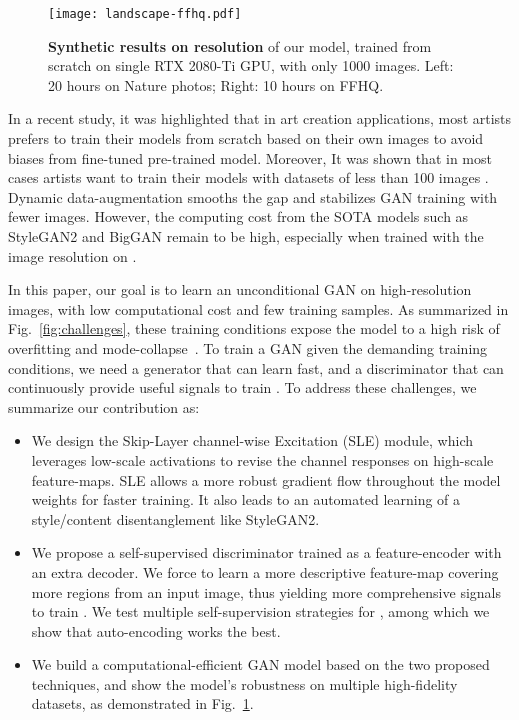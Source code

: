 \documentclass{article} \usepackage{iclr2021_conference,times}
\begin{document}
\begin{figure}[h]
\begin{center}
\texttt{[image: landscape-ffhq.pdf]}
\end{center}
\caption{\textbf{Synthetic results on  resolution} of our model, trained from scratch on single RTX 2080-Ti GPU, with only 1000 images. Left: 20 hours on Nature photos; Right: 10 hours on FFHQ.}
\label{fig:quality-ours}
\end{figure}

In a recent study, it was highlighted that in art creation applications, most artists prefers to train their models from scratch based on their own images to avoid biases from fine-tuned pre-trained model. Moreover, It was shown that in most cases artists want to train their models with datasets of less than 100 images \citep{elgammal2020artists}. Dynamic data-augmentation \citep{karras2020training,zhao2020differentiable} smooths the gap and stabilizes GAN training with fewer images. However, the computing cost from the SOTA models such as StyleGAN2 \citep{karras2020analyzing} and BigGAN \citep{brock2018large} remain to be high, especially when trained with the image resolution on . 

In this paper, our goal is to learn an unconditional GAN on high-resolution images, with low computational cost and few training samples. As summarized in Fig.~\ref{fig:challenges}, these training conditions expose the model to a high risk of  overfitting and mode-collapse~\citep{arjovsky2017towards,zhang2018pa}. To train a GAN given the demanding training conditions, we need a generator  that can learn fast, and a discriminator  that can continuously provide useful signals to train . To address these challenges, we summarize our contribution as:
\begin{itemize}
\item We design the Skip-Layer channel-wise Excitation (SLE) module, which leverages low-scale activations to revise the channel responses on high-scale feature-maps. SLE allows a more robust gradient flow throughout the model weights for faster training. It also leads to an automated learning of a style/content disentanglement like StyleGAN2.  
\item We propose a self-supervised discriminator  trained as a feature-encoder with an extra decoder. We force  to learn a more descriptive feature-map covering more regions from an input image, thus yielding more comprehensive signals to train . We test multiple self-supervision strategies for , among which we show that auto-encoding works the best.
\item We build a computational-efficient GAN model based on the two proposed techniques, and show the model's robustness on multiple high-fidelity datasets, as demonstrated in Fig.~\ref{fig:quality-ours}.
\end{itemize}
\end{document}
